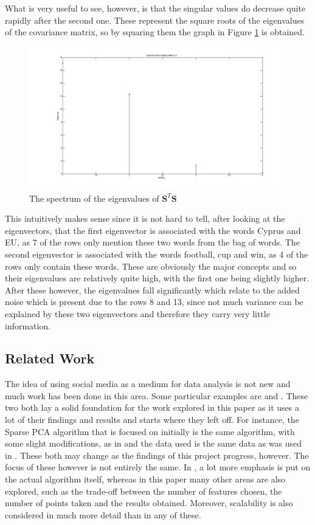 \documentclass[11pt,a4paper]{article}
\begin{document}
What is very useful to see, however, is that the singular values do decrease quite rapidly after the second one. These represent the square roots of the eigenvalues of the covariance matrix, so by squaring them the graph in Figure \ref{spectrum} is obtained.

\begin{figure}[H]
\centering
\includegraphics[scale=0.3]{Spectrum_Eigenvalues.jpg}
\caption{The spectrum of the eigenvalues of $\mathbf{S}^T\mathbf{S}$}
\label{spectrum}
\end{figure}

This intuitively makes sense since it is not hard to tell, after looking at the eigenvectors, that the first eigenvector is associated with the words Cyprus and EU, as 7 of the rows only mention these two words from the bag of words. The second eigenvector is associated with the words football, cup and win, as 4 of the rows only contain these words. These are obviously the major concepts and so their eigenvalues are relatively quite high, with the first one being slightly higher. After these however, the eigenvalues fall significantly which relate to the added noise which is present due to the rows 8 and 13, since not much variance can be explained by these two eigenvectors and therefore they carry very little information. 


\subsection{Related Work}
The idea of using social media as a medium for data analysis is not new and much work has been done in this area. Some particular examples are \cite{dimakis} and \cite{microblogs}. These two both lay a solid foundation for the work explored in this paper as it uses a lot of their findings and results and starts where they left off. For instance, the Sparse PCA algorithm that is focused on initially is the same algorithm, with some slight modifications, as in \cite{dimakis} and the data used is the same data as was used in \cite{microblogs}. These both may change as the findings of this project progress, however. The focus of these however is not entirely the same. In \cite{dimakis}, a lot more emphasis is put on the actual algorithm itself, whereas in this paper many other areas are also explored, such as the trade-off between the number of features chosen, the number of points taken and the results obtained. Moreover, scalability is also considered in much more detail than in any of these. 
\end{document}
